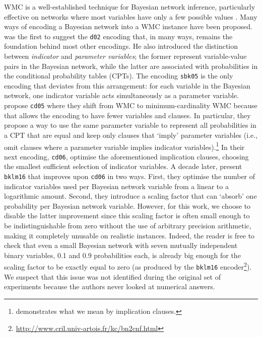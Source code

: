 WMC is a well-established technique for Bayesian network inference, particularly
effective on networks where most variables have only a few possible values
\citep{DBLP:conf/kr/Darwiche02}. Many ways of encoding a Bayesian network into a
WMC instance have been proposed.  was the first
to suggest the \texttt{d02} encoding that, in many ways, remains the foundation
behind most other encodings. He also introduced the distinction between
\emph{indicator} and \emph{parameter variables}; the former represent
variable-value pairs in the Bayesian network, while the latter are associated
with probabilities in the conditional probability tables (CPTs). The encoding
\texttt{sbk05} \citep{DBLP:conf/aaai/SangBK05} is the only encoding that
deviates from this arrangement: for each variable in the Bayesian network, one
indicator variable acts simultaneously as a parameter variable.
 propose \texttt{cd05} where they shift from
WMC to minimum-cardinality WMC because that allows the encoding to have fewer
variables and clauses. In particular, they propose a way to use the same
parameter variable to represent all probabilities in a CPT that are equal and
keep only clauses that `imply' parameter variables (i.e., omit clauses where a
parameter variable implies indicator variables).\footnote{
  demonstrates what we mean by implication clauses.} In their next encoding,
\texttt{cd06}, \citet{DBLP:conf/sat/ChaviraD06} optimise the aforementioned
implication clauses, choosing the smallest sufficient selection of indicator
variables. A decade later, \citet{DBLP:conf/ecai/BartKLM16} present
\texttt{bklm16} that improves upon \texttt{cd06} in two ways. First, they
optimise the number of indicator variables used per Bayesian network variable
from a linear to a logarithmic amount. Second, they introduce a scaling factor
that can `absorb' one probability per Bayesian network variable. However, for
this work, we choose to disable the latter improvement since this scaling factor
is often small enough to be indistinguishable from zero without the use of
arbitrary precision arithmetic, making it completely unusable on realistic
instances. Indeed, the reader is free to check that even a small Bayesian
network with seven mutually independent binary variables, 0.1 and 0.9
probabilities each, is already big enough for the scaling factor to be exactly
equal to zero (as produced by the \texttt{bklm16}
encoder\footnote{\url{http://www.cril.univ-artois.fr/kc/bn2cnf.html}}). We
suspect that this issue was not identified during the original set of
experiments because the authors never looked at numerical answers.


